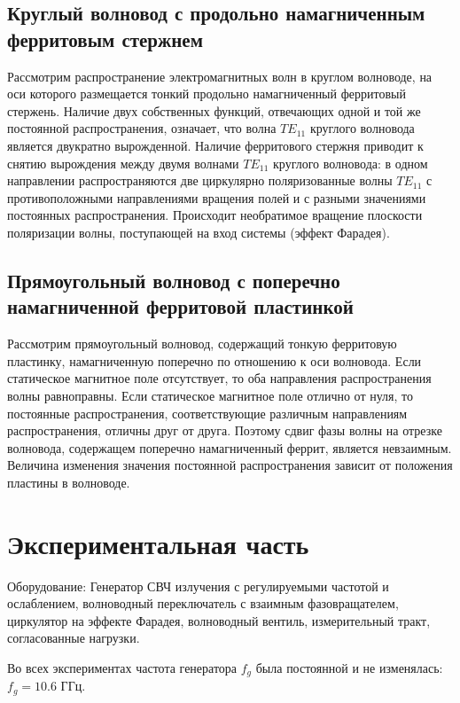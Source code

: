 \subsection{Круглый волновод с продольно намагниченным ферритовым стержнем}
Рассмотрим распространение электромагнитных волн в круглом волноводе, на оси которого размещается тонкий продольно
намагниченный ферритовый стержень. Наличие двух собственных функций, отвечающих одной и той же постоянной
распространения, означает, что волна $TE_{11}$ круглого волновода является двукратно вырожденной. Наличие ферритового
стержня приводит к снятию вырождения между двумя волнами $TE_{11}$ круглого волновода: в одном направлении
распространяются две циркулярно поляризованные волны $TE_{11}$ с противоположными направлениями вращения полей и с
разными значениями постоянных распространения. Происходит необратимое вращение плоскости поляризации волны, поступающей
на вход системы (эффект Фарадея).
\subsection{Прямоугольный волновод с поперечно намагниченной ферритовой пластинкой}
Рассмотрим прямоугольный волновод, содержащий тонкую ферритовую пластинку, намагниченную поперечно по отношению к оси
волновода. Если статическое магнитное поле отсутствует, то оба направления распространения волны равноправны. Если
статическое магнитное поле отлично от нуля, то постоянные распространения, соответствующие различным направлениям
распространения, отличны друг от друга. Поэтому сдвиг фазы волны на отрезке волновода, содержащем поперечно
намагниченный феррит, является невзаимным. Величина изменения значения постоянной распространения зависит от положения
пластины в волноводе. 

\newpage
\section{Экспериментальная часть}

Оборудование: Генератор СВЧ излучения с регулируемыми частотой и ослаблением, волноводный переключатель с взаимным
фазовращателем, циркулятор на эффекте Фарадея, волноводный вентиль, измерительный тракт, согласованные нагрузки.


Во всех экспериментах частота генератора $f_g$ была постоянной и не изменялась: $f_g = 10.6$ ГГц.
